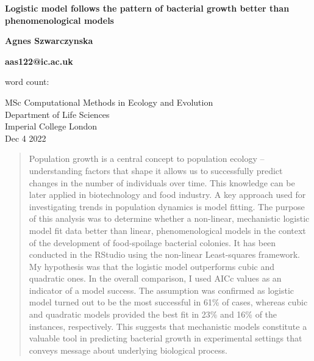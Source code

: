 \documentclass[a4paper,11pt]{article}
\newcommand{\quickwordcount}[1]{%
%
}
\begin{document}
\linespread{1.5}
\begin{titlepage}
    \begin{center}
        \vspace*{4cm}
            
        \Huge
        \textbf{Logistic model follows the pattern of bacterial growth better than phenomenological models}
            
        \vspace{0.5cm}
        \Large
            
        \vspace{1.5cm}
            
        \textbf{Agnes Szwarczynska}
        
        \textbf{aas122@ic.ac.uk}

        word count: \quickwordcount{MiniProject_Latex} 
            
        \vspace{5cm}
            
        \Large
        MSc Computational Methods in Ecology and Evolution\\
        Department of Life Sciences\\
        Imperial College London\\
        Dec 4 2022
            
    \end{center}
\end{titlepage}

\begin{abstract}
Population growth is a central concept to population ecology – understanding factors that shape it allows us to successfully predict changes in the number of individuals over time. This knowledge can be later applied in biotechnology and food industry. A key approach used for investigating trends in population dynamics is model fitting. The purpose of this analysis was to determine whether a non-linear, mechanistic logistic model fit data better than linear, phenomenological models in the context of the development of food-spoilage bacterial colonies. It has been conducted in the RStudio using the non-linear Least-squares framework. My hypothesis was that the logistic model outperforms cubic and quadratic ones. In the overall comparison, I used AICc values as an indicator of a model success. The assumption was confirmed as logistic model turned out to be the most successful in 61\% of cases, whereas cubic and quadratic models provided the best fit in 23\% and 16\% of the instances, respectively. This suggests that mechanistic models constitute a valuable tool in predicting bacterial growth in experimental settings that conveys message about underlying biological process.
\end{abstract}
\end{document}
